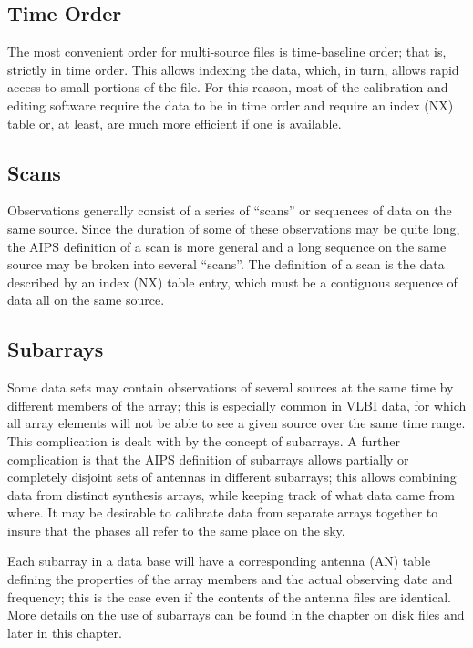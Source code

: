 \subsection{Time Order }
The most convenient order for multi-source files is time-baseline
order; that is, strictly in time order.  This allows indexing the
data, which, in turn, allows rapid access to small portions of the
file.  For this reason, most of the calibration and editing software
require the data to be in time order and require an index (NX) table
or, at least, are much more efficient if one is available.

\subsection{Scans }
Observations generally consist of a series of ``scans'' or sequences of
data on the same source.  Since the duration of some of these
observations may be quite long, the AIPS definition of a scan is more
general and a long sequence on the same source may be broken into
several ``scans''.  The definition of a scan is the data described by
an index (NX) table entry, which must be a contiguous sequence of data
all on the same source.

\subsection{Subarrays }
Some data sets may contain observations of several sources at the same
time by different members of the array; this is especially common in
VLBI data, for which all array elements will not be able to see a
given source over the same time range.  This complication is dealt
with by the concept of subarrays.  A further complication is that the
AIPS definition of subarrays allows partially or completely disjoint
sets of antennas in different subarrays; this allows combining data
from distinct synthesis arrays, while keeping track of what data came
from where.  It may be desirable to calibrate data from separate
arrays together to insure that the phases all refer to the same place
on the sky.

Each subarray in a data base will have a corresponding antenna (AN)
table defining the properties of the array members and the actual
observing date and frequency; this is the case even if the contents of
the antenna files are identical.  More details on the use of subarrays
can be found in the chapter on disk files and later in this chapter.

